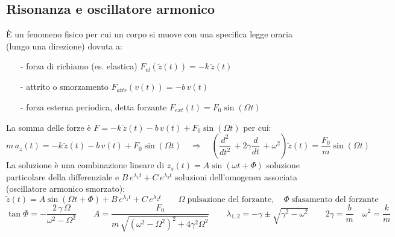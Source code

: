 \documentclass[a4paper]{article}
\newcommand\dt{\frac{d}{dt}\,}
\newcommand\dts{\frac{d^2}{dt^2}\,}
\begin{document}
\subsection{Risonanza e oscillatore armonico}
È un fenomeno fisico per cui un corpo si muove con una specifica legge oraria (lungo una direzione) dovuta a:
\begin{itemize}[topsep=3pt, itemsep=0pt]
	\item[-] forza di richiamo (es. elastica) \(F_{el}(\tilde{z}(t)) = -k \, \tilde{z}(t)\)
	\item[-] attrito o smorzamento \(F_{attr}(v(t)) = -b \, v(t)\)
	\item[-] forza esterna periodica, detta forzante \(F_{ext}(t) = F_0 \sin (\Omega t)\)
\end{itemize}
La somma delle forze è \(F = -k \, \tilde{z}(t) - b \, v(t) + F_0 \sin (\Omega t)\) per cui:
\[m \, a_z(t) = -k \, \tilde{z}(t) - b \, v(t) + F_0 \sin (\Omega t) \quad \Rightarrow \quad \left(\dts + 2\gamma \dt + \omega^2\right) \tilde{z}(t) = \frac{F_0}{m} \sin (\Omega t)\]
La soluzione è una combinazione lineare di \(z_s(t) = A \sin (\omega t + \Phi)\) soluzione particolare della differenziale e
\(B \, e^{\lambda_1 t} + C \, e^{\lambda_2 t}\) soluzioni dell'omogenea associata (oscillatore armonico smorzato):
\[\tilde{z}(t) = A \sin (\Omega t + \Phi) + B \, e^{\lambda_1 t} + C \, e^{\lambda_2 t} \qquad \Omega \; \text{pulsazione del forzante}, \quad \Phi \; \text{sfasamento del forzante}\]
\[\tan \Phi = - \frac{2 \, \gamma \, \Omega}{\omega^2 - \Omega^2} \qquad A = \frac{F_0}{m \, \sqrt{(\omega^2 - \Omega^2)^2 + 4 \gamma^2 \Omega^2}} \qquad \lambda_{1,2} = -\gamma \pm \sqrt{\gamma^2 - \omega^2} \qquad 2\gamma = \frac{b}{m} \quad \omega^2 = \frac{k}{m}\]
\end{document}
